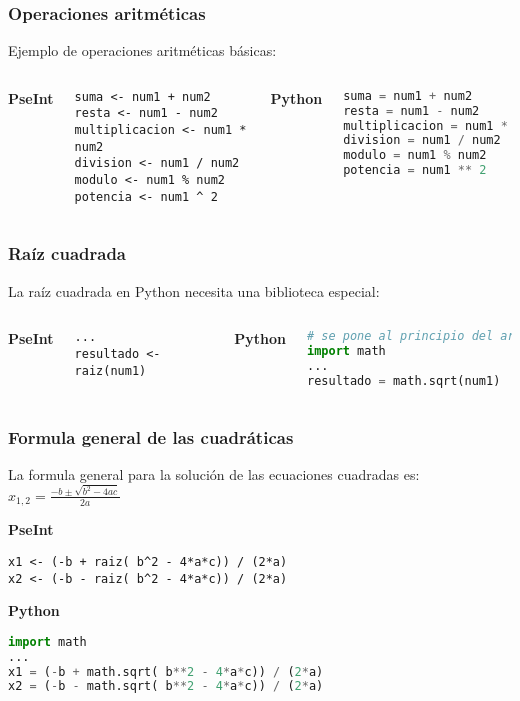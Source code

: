 \begin{frame}[fragile]
  \frametitle{Operaciones aritméticas}

  Ejemplo de operaciones aritméticas básicas:
  \vspace{\baselineskip}
  \begin{columns}
      \textbf{PseInt}
      \begin{lstlisting}[style=pseudocodigo]
suma <- num1 + num2
resta <- num1 - num2
multiplicacion <- num1 * num2
division <- num1 / num2
modulo <- num1 % num2
potencia <- num1 ^ 2
      \end{lstlisting}
    \pausa
      \textbf{Python}
      \begin{lstlisting}[language=Python]
suma = num1 + num2
resta = num1 - num2
multiplicacion = num1 * num2
division = num1 / num2
modulo = num1 % num2
potencia = num1 ** 2
      \end{lstlisting}
  \end{columns}
\end{frame}

\begin{frame}[fragile]
  \frametitle{Raíz cuadrada}

  La raíz cuadrada en Python necesita una biblioteca especial:

  \vspace{\baselineskip}
  \begin{columns}
      \textbf{PseInt}
      \begin{lstlisting}[style=pseudocodigo]
...
resultado <- raiz(num1)
      \end{lstlisting}
    \pausa
      \textbf{Python}
      \begin{lstlisting}[language=Python]
# se pone al principio del archivo
import math
...
resultado = math.sqrt(num1)
      \end{lstlisting}
  \end{columns}
\end{frame}

\begin{frame}[fragile]
  \frametitle{Formula general de las cuadráticas}

  La formula general para la solución de las ecuaciones cuadradas es:
  $x_{1,2} = \frac{-b \pm \sqrt{b^2 - 4ac}}{2a}$

  \vspace{\baselineskip}
  \textbf{PseInt}
  \begin{lstlisting}[style=pseudocodigo]
x1 <- (-b + raiz( b^2 - 4*a*c)) / (2*a)
x2 <- (-b - raiz( b^2 - 4*a*c)) / (2*a)
  \end{lstlisting}
  \pausa

  \textbf{Python}
  \begin{lstlisting}[language=Python]
import math
...
x1 = (-b + math.sqrt( b**2 - 4*a*c)) / (2*a)
x2 = (-b - math.sqrt( b**2 - 4*a*c)) / (2*a)
  \end{lstlisting}
\end{frame}
